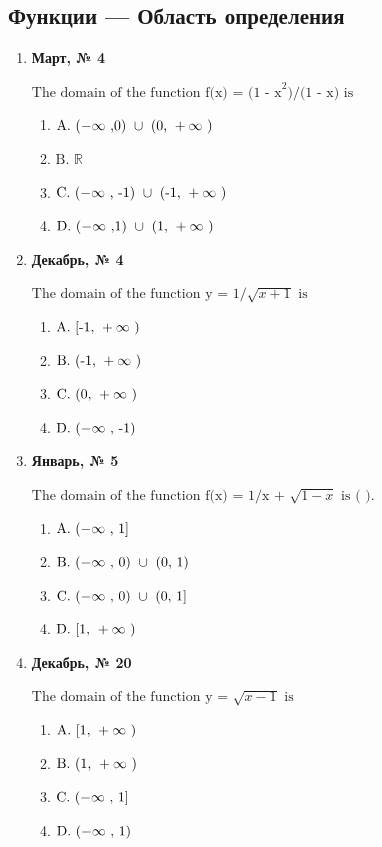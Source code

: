 \subsection*{Функции — Область определения}
\begin{enumerate}
\item \textbf{Март, № 4} \par \smallskip
$\displaystyle \text{The domain of the function f(x) = (1 - x}^{2}\text{)/(1 - x) is}$
\begin{enumerate}
\item $\displaystyle \text{A. }(-\infty\text{ ,0) }\cup\text{  (0, }+\infty\text{ )}$
\item $\displaystyle \text{B. }\mathbb{R}$
\item $\displaystyle \text{C. }(-\infty\text{ , -1) }\cup\text{  (-1, }+\infty\text{ )}$
\item $\displaystyle \text{D. }(-\infty\text{ ,1) }\cup\text{  (1, }+\infty\text{ )}$
\end{enumerate}
\item \textbf{Декабрь, № 4} \par \smallskip
$\displaystyle \text{The domain of the function y = 1/}\sqrt{x+1}\text{ is}$
\begin{enumerate}
\item $\displaystyle \text{A. [-1, }+\infty\text{ )}$
\item $\displaystyle \text{B. (-1, }+\infty\text{ )}$
\item $\displaystyle \text{C. (0, }+\infty\text{ )}$
\item $\displaystyle \text{D. }(-\infty\text{ , -1)}$
\end{enumerate}
\item \textbf{Январь, № 5} \par \smallskip
$\displaystyle \text{The domain of the function f(x) = 1/x + }\sqrt{1 - x}\text{ is ( ).}$
\begin{enumerate}
\item $\displaystyle \text{A. }(-\infty\text{ , 1]}$
\item $\displaystyle \text{B. }(-\infty\text{ , 0) }\cup\text{  (0, 1)}$
\item $\displaystyle \text{C. }(-\infty\text{ , 0) }\cup\text{  (0, 1]}$
\item $\displaystyle \text{D. [1, }+\infty\text{ )}$
\end{enumerate}
\item \textbf{Декабрь, № 20} \par \smallskip
$\displaystyle \text{The domain of the function y = }\sqrt{x - 1}\text{ is}$
\begin{enumerate}
\item $\displaystyle \text{A. [1, }+\infty\text{ )}$
\item $\displaystyle \text{B. (1, }+\infty\text{ )}$
\item $\displaystyle \text{C. }(-\infty\text{ , 1]}$
\item $\displaystyle \text{D. }(-\infty\text{ , 1)}$
\end{enumerate}
\end{enumerate}

